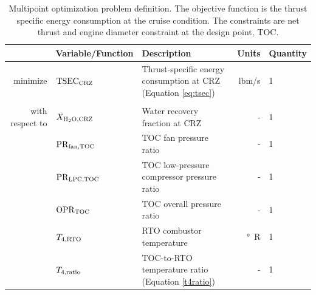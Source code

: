 \documentclass[conf]{new-aiaa}
\begin{document}
\begin{table}[hbt!]
    \centering
    \caption{
        Multipoint optimization problem definition.
        The objective function is the thrust specific energy consumption at the cruise condition.
        The constraints are net thrust and engine diameter constraint at the design point, TOC.
    }
    \small
    \renewcommand{\arraystretch}{1.2}
    \begin{tabular}{r l l r l}
        \toprule
                        & Variable/Function              & Description                                                           & Units          & Quantity \\
        \hline
        minimize        & $\rm{TSEC}_{\rm{CRZ}} $        & Thrust-specific energy consumption at CRZ (Equation \eqref{eq:tsec})  & \si{lbm/s}     & 1        \\
                        &                                &                                                                       &                &          \\
        with respect to & $X_{\rm{H_2O,CRZ}}$            & Water recovery fraction at CRZ                                        & -              & 1        \\
                        & $\rm{PR}_{\rm{fan,TOC}}$       & TOC fan pressure ratio                                                & -              & 1        \\
                        & $\rm{PR}_{\rm{LPC,TOC}}$       & TOC low-pressure compressor pressure ratio                            & -              & 1        \\
                        & $\rm{OPR}_{\rm{TOC}}$          & TOC overall pressure ratio                                            & -              & 1        \\
                        & $T_{4,\rm{RTO}}$               & RTO combustor temperature                                             & \si{\degree R} & 1        \\
                        & $T_{4,\rm{ratio}}$             & TOC-to-RTO temperature ratio (Equation \eqref{t4ratio})               & -              & 1        \\

\end{tabular}
\end{table}
\end{document}
